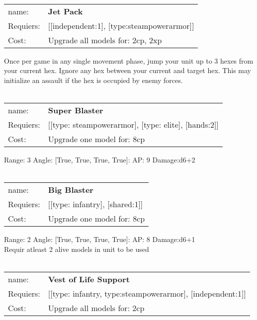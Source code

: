 \ \\
\begin{tabular}{ll}
name: & {\bf Jet Pack } \\
Requiers: & [[independent:1], [type:steampowerarmor]] \\
Cost: & Upgrade all models for: 2cp, 2xp \\
\end{tabular}

Once per game in any single movement phase, jump your unit up to 3 hexes from your current hex. Ignore any hex between your current and target hex. This may initialize an assault if the hex is occupied by enemy forces.\\ 









\ \\
\begin{tabular}{ll}
name: & {\bf Super Blaster } \\
Requiers: & [[type: steampowerarmor], [type: elite], [hands:2]] \\
Cost: & Upgrade one model for: 8cp \\
\end{tabular}



Range: 3  Angle: [True, True, True, True]: AP: 9 Damage:d6+2 \\








\ \\
\begin{tabular}{ll}
name: & {\bf Big Blaster } \\
Requiers: & [[type: infantry], [shared:1]] \\
Cost: & Upgrade one model for: 8cp \\
\end{tabular}



Range: 2  Angle: [True, True, True, True]: AP: 8 Damage:d6+1 \\
Requir atleast 2 alive models in unit to be used\\ 








\ \\
\begin{tabular}{ll}
name: & {\bf Vest of Life Support } \\
Requiers: & [[type: infantry, type:steampowerarmor], [independent:1]] \\
Cost: & Upgrade all models for: 2cp \\
\end{tabular}


